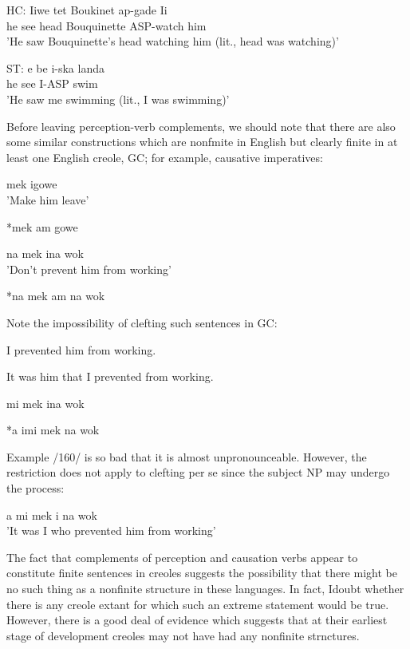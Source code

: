 \ea\label{ex:151}
\gll HC: Iiwe tet Boukinet ap-gade Ii\\
he see head Bouquinette ASP-watch him \\
\glt 'He saw Bouquinette's head watching him (lit., head was watching)'
\z





\ea\label{ex:152}
 \gll ST: e be i-ska landa\\
he see I-ASP swim\\
\glt 'He saw me swimming (lit., I was swimming)'
\z





Before leaving perception-verb complements, we should note that there are also some similar constructions which are nonfmite in English but clearly finite in at least one English creole, GC; for example, causative imperatives:

\ea\label{ex:153}
 mek igowe\\
\glt 'Make him leave'
\z



\ea\label{ex:154}
 *mek am gowe \\
\z

\ea\label{ex:155}
 na mek ina wok\\
\glt 'Don't prevent him from working'
\z




\ea\label{ex:156}
 *na mek am na wok\\
\z

Note the impossibility of clefting such sentences in GC:


\ea\label{ex:157}
I prevented him from working.
\z

\ea\label{ex:158}
 It was him that I prevented from working.
\z

\ea\label{ex:159}
 mi mek ina wok
\z

\ea\label{ex:160}
 *a imi mek na wok
\z

Example /160/ is so bad that it is almost unpronounceable. However, the restriction does not apply to clefting per se since the subject NP may undergo the process:

\ea\label{ex:161}
 a mi mek i na wok\\
\glt 'It was I who prevented him from working'
\z



The fact that complements of perception and causation verbs appear to constitute finite sentences in creoles suggests the possibility that there might be no such thing as a nonfinite structure in these languages. In fact, Idoubt whether there is any creole extant for which such an extreme statement would be true. However, there is a good deal of evidence which suggests that at their earliest stage of develop\-ment creoles may not have had any nonfinite strnctures.

